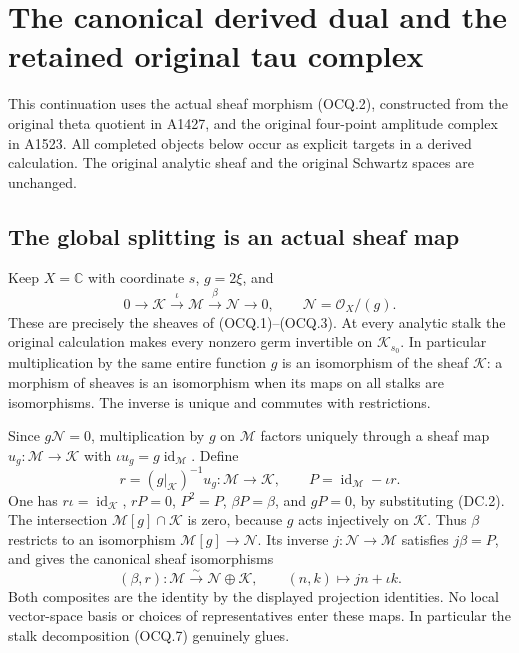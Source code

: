 \section{The canonical derived dual and the retained original tau complex}
\label{sec:canonical-coherent-bidual}

This continuation uses the actual sheaf morphism (OCQ.2), constructed
from the original theta quotient in A1427, and the original four-point
amplitude complex in A1523.  All completed objects below occur as
explicit targets in a derived calculation.  The original analytic
sheaf and the original Schwartz spaces are unchanged.

\subsection{The global splitting is an actual sheaf map}

Keep $X=\mathbb C$ with coordinate $s$, $g=2\xi$, and
\[
 0\longrightarrow\mathcal K\xrightarrow{\iota}\mathcal M
 \xrightarrow{\beta}\mathcal N\longrightarrow0,
 \qquad \mathcal N=\mathcal O_X/(g).
 \tag{DC.1}
\]
These are precisely the sheaves of (OCQ.1)--(OCQ.3).  At every
analytic stalk the original calculation makes every nonzero germ
invertible on $\mathcal K_{s_0}$.  In particular multiplication by
the same entire function $g$ is an isomorphism of the sheaf
$\mathcal K$: a morphism of sheaves is an isomorphism when its maps
on all stalks are isomorphisms.  The inverse is unique and commutes
with restrictions.

Since $g\mathcal N=0$, multiplication by $g$ on $\mathcal M$ factors
uniquely through a sheaf map $u_g:\mathcal M\to\mathcal K$ with
$\iota u_g=g\operatorname{id}_{\mathcal M}$.  Define
\[
 r=(g|_{\mathcal K})^{-1}u_g:\mathcal M\longrightarrow\mathcal K,
 \qquad P=\operatorname{id}_{\mathcal M}-\iota r.
 \tag{DC.2}
\]
One has $r\iota=\operatorname{id}_{\mathcal K}$, $rP=0$,
$P^2=P$, $\beta P=\beta$, and $gP=0$, by substituting (DC.2).
The intersection $\mathcal M[g]\cap\mathcal K$ is zero, because
$g$ acts injectively on $\mathcal K$.  Thus $\beta$ restricts to an
isomorphism $\mathcal M[g]\to\mathcal N$.  Its inverse
$j:\mathcal N\to\mathcal M$ satisfies $j\beta=P$, and gives the
canonical sheaf isomorphisms
\[
 (\beta,r):\mathcal M\xrightarrow{\sim}\mathcal N\oplus\mathcal K,
 \qquad (n,k)\longmapsto jn+\iota k.
 \tag{DC.3}
\]
Both composites are the identity by the displayed projection identities.
No local vector-space basis or choices of representatives enter these
maps.  In particular the stalk decomposition (OCQ.7) genuinely glues.

